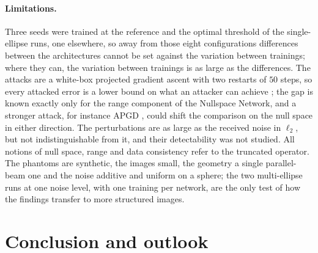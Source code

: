 \documentclass{article}
\numberwithin{equation}{section}
\begin{document}
\paragraph{Limitations.} Three seeds were trained at the reference and the optimal threshold of the
single-ellipse runs, one elsewhere, so away from those eight configurations differences between the
architectures cannot be set against the variation between trainings; where they can, the variation between
trainings is as large as the differences. The attacks are a white-box projected
gradient ascent with two restarts of $50$ steps, so every attacked error is a lower bound on what an
attacker can achieve \parencite{croce2020reliable}; the gap is known exactly only for the range component of
the Nullspace Network, and a stronger attack, for instance APGD \parencite{croce2020reliable}, could shift the
comparison on the null space in either direction. The perturbations are as large as the received noise in
$\ell_2$, but not indistinguishable from it, and their detectability was not studied. All notions of null
space, range and data consistency refer to the truncated operator. The phantoms are synthetic, the images
small, the geometry a single parallel-beam one and the noise additive and uniform on a sphere; the
two multi-ellipse runs at one noise level, with one training per network, are the only test of how the
findings transfer to more structured images.

\section{Conclusion and outlook}\label{sec:conclusion}
\end{document}
